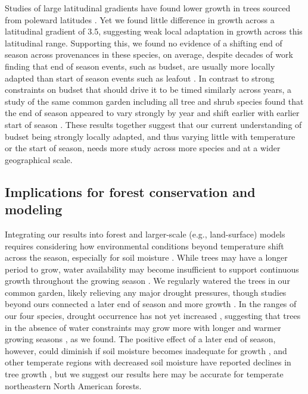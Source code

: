 \documentclass{article}\usepackage[]{graphicx}\usepackage[]{xcolor}
\begin{document}
Studies of large latitudinal gradients have found lower growth in trees sourced from poleward latitudes \citep{aitken_time_2016,soolanayakanahally_timing_2013}. Yet we found little difference in growth across a latitudinal gradient of 3.5\degree, suggesting weak local adaptation in growth across this latitudinal range. Supporting this, we found no evidence of a shifting end of season across provenances in these species, on average, despite decades of work finding that end of season events, such as budset, are usually more locally adapted than start of season events such as leafout \citep{kramer_effect_1936,habjorg_photoperiodic_1978,soolanayakanahally_timing_2013,aitken_time_2016,zeng_weak_2024}. In contrast to strong constraints on budset that should drive it to be timed similarly across years, a study of the same common garden including all tree and shrub species found that the end of season appeared to vary strongly by year and shift earlier with earlier start of season \citep{buonaiuto_early_2026}. These results together suggest that our current understanding of budset being strongly locally adapted, and thus varying little with temperature or the start of season, needs more study across more species and at a wider geographical scale.

\subsection*{Implications for forest conservation and modeling}
Integrating our results into forest and larger-scale (e.g., land-surface) models requires considering how environmental conditions beyond temperature shift across the season, especially for soil moisture \citep{gaoEarlierStartThermal2022,li_widespread_2023}. While trees may have a longer period to grow, water availability may become insufficient to support continuous growth throughout the growing season \citep{lempereur_growth_2015, wang_seasonal_2025}. We regularly watered the trees in our common garden, likely relieving any major drought pressures, though studies beyond ours connected a later end of season and more growth \citep[see:][]{gaoEarlierStartThermal2022,wang_seasonal_2025}. In the ranges of our four species, drought occurrence has not yet increased \citep{nationalcentersforenvironmentalinformationncei_north_2026,agel_drought_2025}, suggesting that trees in the absence of water constraints may grow more with longer and warmer growing seasons \citep{cook_uncertainty_2011,agel_drought_2025,dorangeville_beneficial_2018}, as we found. The positive effect of a later end of season, however, could diminish if soil moisture becomes inadequate for growth \citep[as recently shown in our region by][]{jurado_increasing_2025}, and other temperate regions with decreased soil moisture have reported declines in tree growth \citep[e.g.,][]{spinoni_will_2018,zhang_drought_2021}, but we suggest our results here may be accurate for temperate northeastern North American forests.
\end{document}
